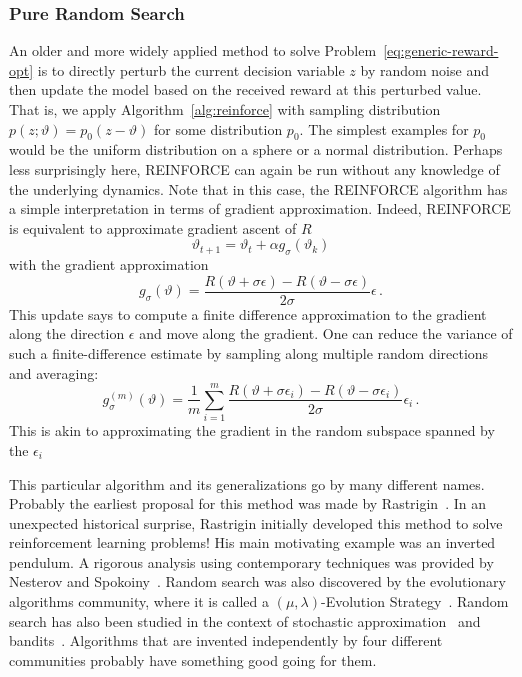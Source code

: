\documentclass[11pt]{article}
\newcommand{\eqd}[1]{\eqref{eq:#1}}
\numberwithin{equation}{section}
\begin{document}
\subsubsection{Pure Random Search}

An older and more widely applied method to solve Problem~\eqd{generic-reward-opt} is to directly perturb the current decision variable $z$ by random noise and then update the model based on the received reward at this perturbed value. That is, we apply Algorithm~\ref{alg:reinforce} with sampling distribution $p(z;\vartheta) = p_0(z-\vartheta)$ for some distribution $p_0$. The simplest examples for $p_0$ would be the uniform distribution on a sphere or a normal distribution. Perhaps less surprisingly here, REINFORCE can again be run without any knowledge of the underlying dynamics. Note that in this case, the REINFORCE algorithm has a simple interpretation in terms of gradient approximation. Indeed, REINFORCE is equivalent to approximate gradient ascent of $R$
$$
	\vartheta_{t+1} = \vartheta_{t} + \alpha g_\sigma(\vartheta_k)
$$
 with the gradient approximation
$$
	g_\sigma(\vartheta) = \frac{R(\vartheta + \sigma \epsilon) - R(\vartheta - \sigma \epsilon) }{2\sigma} \epsilon\,.
$$
This update says to compute a finite difference approximation to the gradient along the direction $\epsilon$ and move along the gradient. One can reduce the variance of such a finite-difference estimate by sampling along multiple random directions and averaging:
$$
	g^{(m)}_\sigma(\vartheta) = \frac{1}{m} \sum_{i=1}^m\frac{R(\vartheta + \sigma \epsilon_i) - R(\vartheta - \sigma \epsilon_i) }{2\sigma} \epsilon_i\,.
$$
This is akin to approximating the gradient in the random subspace spanned by the $\epsilon_i$


This particular algorithm and its generalizations go by many different names. Probably the earliest proposal for this method was made by Rastrigin~\cite{Rastrigin63}. In an unexpected historical surprise, Rastrigin initially developed this method to solve reinforcement learning problems! His main motivating example was an inverted pendulum. A rigorous analysis using contemporary techniques was provided by Nesterov and Spokoiny~\cite{nesterov2017random}. Random search was also discovered by the evolutionary algorithms community, where it is called a $(\mu,\lambda)$-Evolution Strategy~\cite{Beyer02,SchwefelThesis}. Random search has also been studied in the context of stochastic approximation~\cite{spall1992multivariate} and bandits~\cite{flaxman2005online,agarwal2010optimal}. Algorithms that are invented independently by four different communities probably have something good going for them.
\end{document}
